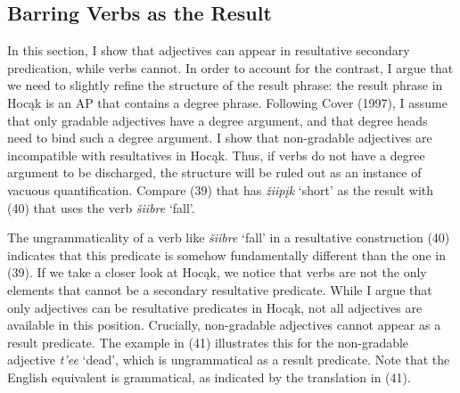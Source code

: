 \documentclass[output=paper]{LSP/langsci}
\begin{document}
\subsection{Barring Verbs as the Result}

In this section, I show that adjectives can appear in resultative secondary predication, while verbs cannot. In order to account for the contrast, I argue that we need to slightly refine the structure of the result phrase: the result phrase in Hoc\k{a}k is an AP that contains a degree phrase. Following Cover (1997), I assume that only gradable adjectives have a degree argument, and that degree heads need to bind such a degree argument. I show that non-gradable adjectives are incompatible with resultatives in Hoc\k{a}k. Thus, if verbs do not have a degree argument to be discharged, the structure will be ruled out as an instance of vacuous quantification. Compare (39) that has \textit{\v{z}iip\k{i}k} `short' as the result with (40) that uses the verb \textit{\v{s}iibre} `fall'.

\begin{exe}



\end{exe}

The ungrammaticality of a verb like \textit{\v{s}iibre} `fall' in a resultative construction (40) indicates that this predicate is somehow fundamentally different than the one in (39). If we take a closer look at Hoc\k{a}k, we notice that verbs are not the only elements that cannot be a secondary resultative predicate. While I argue that only adjectives can be resultative predicates in Hoc\k{a}k, not all adjectives are available in this position. Crucially, non-gradable adjectives cannot appear as a result predicate. The example in (41) illustrates this for the non-gradable adjective \textit{t'ee} `dead', which is ungrammatical as a result predicate. Note that the English equivalent is grammatical, as indicated by the translation in (41).
\end{document}
